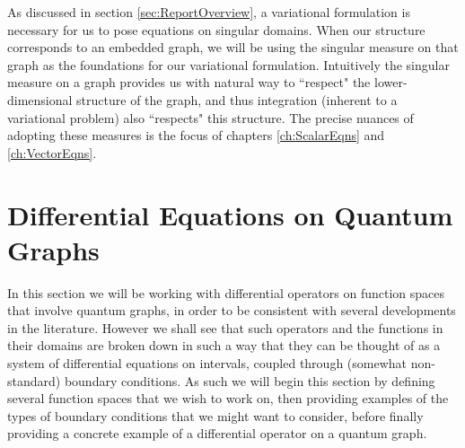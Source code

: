 As discussed in section \ref{sec:ReportOverview}, a variational formulation is necessary for us to pose equations on singular domains.
When our structure corresponds to an embedded graph, we will be using the singular measure on that graph as the foundations for our variational formulation.
Intuitively the singular measure on a graph provides us with natural way to ``respect" the lower-dimensional structure of the graph, and thus integration (inherent to a variational problem) also ``respects" this structure.
The precise nuances of adopting these measures is the focus of chapters \ref{ch:ScalarEqns} and \ref{ch:VectorEqns}.

\section{Differential Equations on Quantum Graphs} \label{sec:DEonQG}
In this section we will be working with differential operators on function spaces that involve quantum graphs, in order to be consistent with several developments in the literature.
However we shall see that such operators and the functions in their domains are broken down in such a way that they can be thought of as a system of differential equations on intervals, coupled through (somewhat non-standard) boundary conditions.
As such we will begin this section by defining several function spaces that we wish to work on, then providing examples of the types of boundary conditions that we might want to consider, before finally providing a concrete example of a differential operator on a quantum graph. 
\newline

